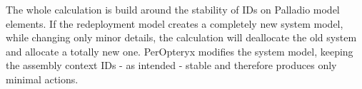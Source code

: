 The whole calculation is build around the stability of IDs on Palladio model elements. If the redeployment model creates a completely new system model, while changing only minor details, the calculation will deallocate the old system and allocate a totally new one. PerOpteryx modifies the system model, keeping the assembly context IDs - as intended - stable and therefore produces only minimal actions.





